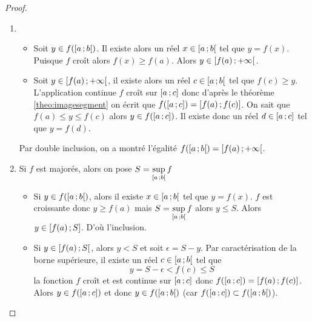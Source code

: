 \begin{proof}
  \begin{enumerate}
    \item
      \begin{itemize}
        \item Soit \(y \in f(\left[ a \, ;  b \right[)\). Il existe alors un réel \(x 
          \in \left[ a \, ;  b \right[\) tel que \(y=f(x)\). Puisque \(f\) croît 
          alors \(f(x) \geqslant f(a)\). Alors \(y \in 
          \left[ f(a) \, ;  +\infty \right[\).
        \item Soit \(y \in \left[ f(a) \, ;  +\infty \right[\), il existe alors un 
          réel \(c \in \left[ a \, ;  b \right[\) tel que \(f(c) \geqslant y\). 
          L'application continue \(f\) croît sur \(\left[ a \, ;  c \right]\) donc 
          d'après le théorème~
          \ref{theo:imagesegment} on écrit que 
          \(f(\left[ a \, ;  c \right])=\left[ f(a) \, ;  f(c) \right]\). On sait que 
          \(f(a) \le y \leqslant f(c)\) alors \(y \in f(\left[ a \, ;  c \right])\). 
          Il existe donc un réel \(d \in \left[ a \, ;  c \right]\) tel que 
          \(y=f(d)\).
      \end{itemize}
      Par double inclusion, on a montré l'égalité 
      \(f(\left[ a \, ;  b \right[)=\left[ f(a) \, ;  +\infty \right[\).
    \item Si \(f\) est majorés, alors on pose 
      \(S=\sup\limits_{\left[ a \, ;  b \right[}f\)
      \begin{itemize}
        \item Si \(y \in f(\left[ a \, ;  b \right[)\), alors il existe \(x \in 
          \left[ a \, ;  b \right[\) tel que \(y=f(x)\). \(f\) est croissante donc 
          \(y \geqslant f(a)\) mais \(S=\sup\limits_{\left[ a \, ;  b \right[}f\) 
          alors \(y \leqslant S\). Alors \(y \in \left[ f(a) \, ;  S \right]\). D'où 
          l'inclusion.
        \item Si \(y \in \left[ f(a) \, ;  S \right[\), alors \(y < S\) et soit 
          \(\epsilon=S-y\). Par caractérisation de la borne supérieure, il 
          existe un réel \(c \in \left[ a \, ;  b \right[\) tel que
          \begin{equation}
            y=S-\epsilon < f(c) \leqslant S
          \end{equation}
          la fonction \(f\) croît et est continue sur \(\left[ a \, ;  c \right]\) 
          donc \(f(\left[ a \, ;  c \right])=\left[ f(a) \, ;  f(c) \right]\). Alors \(y 
          \in f(\left[ a \, ;  c \right])\) et donc \(y \in f(\left[ a \, ;  b \right[)\) 
          (car \(f(\left[ a \, ;  c \right]) \subset f(\left[ a \, ;  b \right[)\)).

\end{itemize}
\end{enumerate}
\end{proof}
